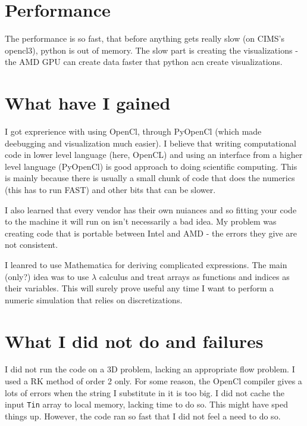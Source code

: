 \documentclass[paper=a4, fontsize=11pt]{scrartcl} %
\numberwithin{equation}{section} %
\numberwithin{figure}{section} %
\numberwithin{table}{section} %
\newcommand{\coder}[1]{\texttt{#1}}
\begin{document}
\section{Performance}
The performance is so fast, that before anything gets really slow (on CIMS's opencl3), python is out of memory. The slow part is creating the 
visualizations - the AMD GPU can create data faster that python acn create visualizations.



\section{What have I gained}
I got exprerience with using OpenCl, through PyOpenCl (which made deebugging and visualization much easier). I believe that writing 
computational code in lower level language (here, OpenCL) and using an interface from a higher level language (PyOpenCl) is good
approach to doing scientific computing. This is mainly because there is usually a small chunk of code that does the numerics (this has to 
run FAST) and other bits that can be slower.

I also learned that every vendor has their own nuiances and so fitting your code to the machine it will run on isn't necessarily
a bad idea. My problem was creating code that is portable between Intel and AMD - the errors they give are not consistent.

I leanred to use Mathematica for deriving complicated expressions. The main (only?) idea was to use $\lambda$ calculus
and treat arrays as functions and indices as their variables. This will surely prove useful any time I want to perform a numeric
simulation that relies on discretizations.

\section{What I did not do and failures}
I did not run the code on a 3D problem, lacking an appropriate flow problem. I used a RK method of order 2 only.
For some reason, the OpenCl compiler gives a lots of
errors when the string I substitute in it is too big. I did not cache the input \coder{Tin} array to local memory, lacking time to do so. 
This might have sped things up. However, the code ran so fast that I did not feel a need to do so.

\newpage
\end{document}
